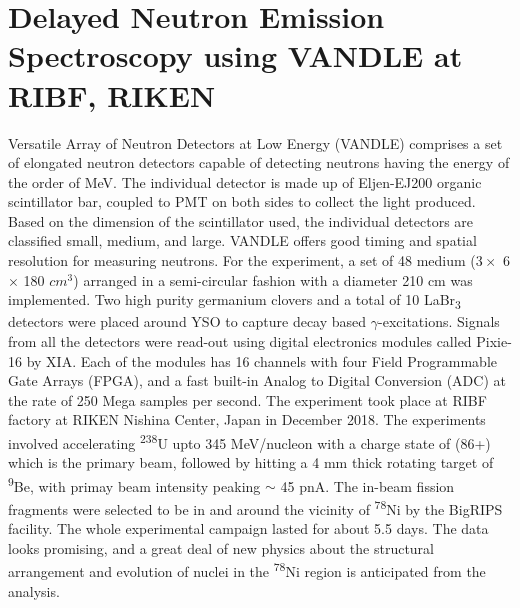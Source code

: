 \documentclass[a4paper,12pt,twoside]{report}
\begin{document}
\section{Delayed Neutron Emission Spectroscopy using \textbf{VANDLE} at RIBF, RIKEN}
Versatile Array of Neutron Detectors at Low Energy (VANDLE) comprises a set of elongated neutron detectors capable of detecting neutrons having the energy of the order of MeV. The individual detector is made up of Eljen-EJ200 organic scintillator bar, coupled to PMT on both sides to collect the light produced. Based on the dimension of the scintillator used, the individual detectors are classified small, medium, and large. VANDLE offers good timing and spatial resolution \cite{VANDLE} for measuring neutrons. For the experiment, a set of 48 medium ($3 \times$ 6 $\times$ 180 $cm^{3}$) arranged in a semi-circular fashion with a diameter 210 cm was implemented. Two high purity germanium clovers and a total of 10 LaBr\textsubscript{3} detectors were placed around YSO to capture decay based $\gamma$-excitations. Signals from all the detectors were read-out using digital electronics modules called Pixie-16 \cite{PIXIE16} by XIA. Each of the modules has 16 channels with four Field Programmable Gate Arrays (FPGA), and a fast built-in Analog to Digital Conversion (ADC) at the rate of 250 Mega samples per second. The experiment took place at RIBF factory at RIKEN Nishina Center, Japan in December 2018. The experiments involved accelerating \textsuperscript{238}U upto 345 MeV/nucleon with a charge state of (86+) which is the primary beam, followed by hitting a 4 mm thick rotating target of \textsuperscript{9}Be, with primay beam intensity peaking $\sim$ 45 pnA. The in-beam fission fragments were selected to be in and around the vicinity of \textsuperscript{78}Ni by the BigRIPS \cite{FUKUDA2013323} facility. The whole experimental campaign lasted for about 5.5 days. The data looks promising, and a great deal of new physics about the structural arrangement and evolution of nuclei in the \textsuperscript{78}Ni region is anticipated from the analysis.
\end{document}
